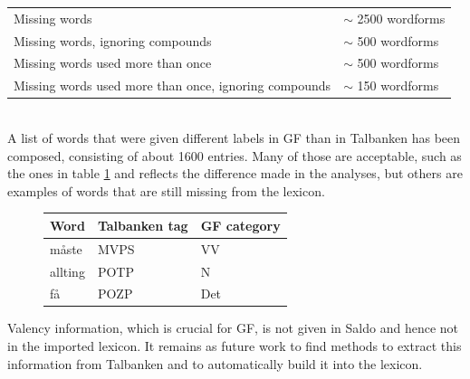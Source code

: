 \documentclass{report}
\begin{document}
\begin{tabular}{|l|l|}
\hline
Missing words & $\sim$ 2500 wordforms\\
Missing words, ignoring compounds & $\sim$ 500 wordforms\\
Missing words used more than once & $\sim$ 500 wordforms\\
Missing words used more than once, ignoring compounds & $\sim$ 150 wordforms\\
\hline
\end{tabular}\\

A list of words that were given different labels in GF than in Talbanken has been
composed, consisting of about 1600 entries. Many of those are
acceptable, such as the ones in table \ref{tab:saldodiff} and reflects the difference 
made in the analyses, but others are examples of words that are still missing from
the lexicon.
\begin{figure}[h]
\begin{tabular}{|lll|}
\hline
Word & Talbanken tag & GF category \\
\hline
måste & MVPS          & VV \\
allting & POTP & N \\
få & POZP & Det \\
\hline
\end{tabular}
\caption{}
\label{tab:saldodiff}
\end{figure}

Valency information, which is crucial for GF, is not given in Saldo and
hence not in the imported lexicon. It remains as future work to find methods 
to extract this information from Talbanken and to automatically build
it into the lexicon. 
\end{document}
